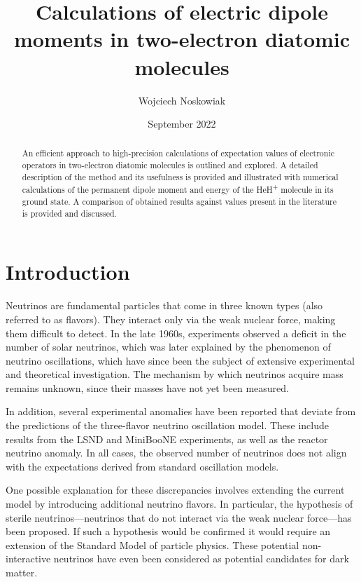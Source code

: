 \documentclass{pracalicmgr}
\author{Wojciech Noskowiak}
\title{Calculations of electric dipole moments in two-electron diatomic molecules}
\date{September 2022}
\begin{document}
\maketitle
\let\cleardoublepage\clearpage

\begin{abstract}
    An efficient approach to high-precision calculations of expectation values of electronic operators in two-electron diatomic molecules is outlined and explored. A detailed description of the method and its usefulness is provided and illustrated with numerical calculations of the permanent dipole moment and energy of the HeH\textsuperscript{+} molecule in its ground state. A comparison of obtained results against values present in the literature is provided and discussed.
\end{abstract}

\tableofcontents


\chapter*{Introduction}

Neutrinos are fundamental particles that come in three known types (also referred to as flavors). They interact only via the weak nuclear force, making them difficult to detect. In the late 1960s, experiments observed a deficit in the number of solar neutrinos, which was later explained by the phenomenon of neutrino oscillations, which have since been the subject of extensive experimental and theoretical investigation. The mechanism by which neutrinos acquire mass remains unknown, since their masses have not yet been measured.

In addition, several experimental anomalies have been reported that deviate from the predictions of the three-flavor neutrino oscillation model. These include results from the LSND and MiniBooNE experiments, as well as the reactor neutrino anomaly. In all cases, the observed number of neutrinos does not align with the expectations derived from standard oscillation models.

One possible explanation for these discrepancies involves extending the current model by introducing additional neutrino flavors. In particular, the hypothesis of sterile neutrinos—neutrinos that do not interact via the weak nuclear force—has been proposed. If such a hypothesis would be confirmed it would require an extension of the Standard Model of particle physics. These potential non-interactive neutrinos have even been considered as potential candidates for dark matter.
\end{document}
